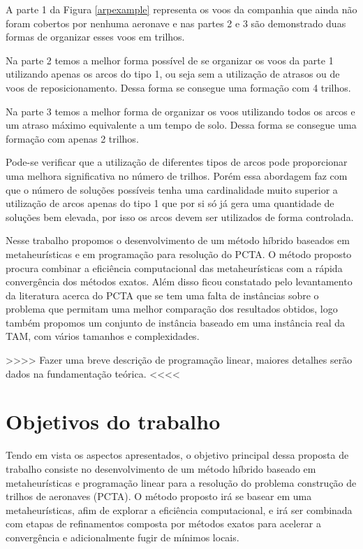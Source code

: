 A parte 1 da Figura \ref{arpexample} representa os voos da companhia que ainda não foram cobertos por nenhuma aeronave e nas partes 2 e 3 são demonstrado duas formas de organizar esses voos em trilhos. 

	Na parte 2 temos a melhor forma possível de se organizar os voos da parte 1 utilizando apenas os arcos do tipo 1, ou seja sem a utilização de atrasos ou de voos de reposicionamento. Dessa forma se consegue uma formação com 4 trilhos.

	Na parte 3 temos a melhor forma de organizar os voos utilizando todos os arcos e um atraso máximo equivalente a um tempo de solo. Dessa forma se consegue uma formação com apenas 2 trilhos.

	Pode-se verificar que a utilização de diferentes tipos de arcos pode proporcionar uma melhora significativa  no número de trilhos. Porém essa abordagem faz com que o número de soluções possíveis tenha uma cardinalidade muito superior a utilização de arcos apenas do tipo 1 que por si só já gera uma quantidade de soluções bem elevada, por isso os arcos devem ser utilizados de forma controlada. 

	Nesse trabalho propomos o desenvolvimento de um método híbrido baseados em metaheurísticas e em programação para resolução do PCTA. O método proposto procura combinar a eficiência computacional das metaheurísticas com a rápida convergência dos métodos exatos. Além disso ficou constatado pelo levantamento da literatura acerca do PCTA que se tem uma falta de instâncias sobre o problema que permitam uma melhor comparação dos resultados obtidos, logo também propomos um conjunto de instância baseado em uma instância real da TAM, com vários tamanhos e complexidades. 

{\large	>>>> Fazer uma breve descrição de programação linear, maiores detalhes serão dados na fundamentação teórica. <<<<	}

\section {Objetivos do trabalho}

Tendo em vista os aspectos apresentados, o objetivo principal dessa proposta de trabalho consiste no desenvolvimento de um método híbrido baseado em metaheurísticas e programação linear para a resolução do problema construção de trilhos de aeronaves (PCTA). O método proposto irá se basear em uma metaheurísticas, afim de explorar a eficiência computacional, e irá ser combinada com etapas de refinamentos composta por métodos exatos para acelerar a convergência e adicionalmente fugir de mínimos locais.

